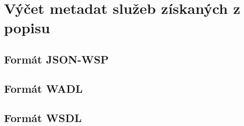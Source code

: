 \documentclass[czech,DP]{thesiskiv}
\begin{document}
\chapter{Výčet metadat služeb získaných z popisu}

\section*{Formát JSON-WSP}

\section*{Formát WADL}

\section*{Formát WSDL}
\end{document}
